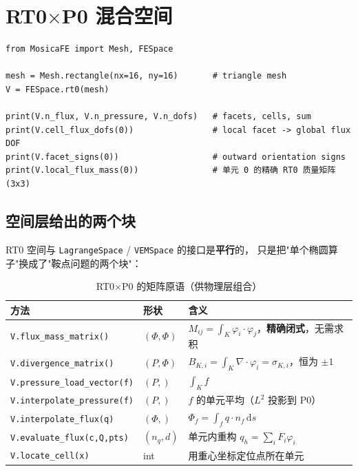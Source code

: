 \documentclass[UTF8,11pt,oneside]{ctexbook}
\theoremstyle{definition}
\theoremstyle{plain}
\newcommand{\code}[1]{\texttt{#1}}
\newcommand{\dif}{\,\mathrm{d}}
\begin{document}
\section{RT0$\times$P0 混合空间}

\begin{lstlisting}[language=MosicaFE,caption={示例 5.3：混合空间}]
from MosicaFE import Mesh, FESpace

mesh = Mesh.rectangle(nx=16, ny=16)       # triangle mesh
V = FESpace.rt0(mesh)

print(V.n_flux, V.n_pressure, V.n_dofs)   # facets, cells, sum
print(V.cell_flux_dofs(0))                # local facet -> global flux DOF
print(V.facet_signs(0))                   # outward orientation signs
print(V.local_flux_mass(0))               # 单元 0 的精确 RT0 质量矩阵 (3x3)
\end{lstlisting}

\subsection{空间层给出的两个块}

RT0 空间与 \code{LagrangeSpace} / \code{VEMSpace} 的接口是\textbf{平行}的，
只是把"单个椭圆算子"换成了"鞍点问题的两个块"：

\begin{table}[htbp]
\centering
\caption{RT0$\times$P0 的矩阵原语（供物理层组合）}
\label{tab:rt0-blocks}
\begin{lrbox}{\guideTableBox}
\begin{tabular}{@{}L{5.4cm}L{2.9cm}L{6.1cm}@{}}
\toprule
方法 & 形状 & 含义 \\
\midrule
\code{V.flux\_\allowbreak mass\_\allowbreak matrix()} & $(\Phi,\Phi)$ & $M_{ij}=\int_K\varphi_i\cdot\varphi_j$，\textbf{精确闭式}，无需求积 \\
\code{V.divergence\_\allowbreak matrix()} & $(P,\Phi)$ & $B_{K,i}=\int_K\nabla\cdot\varphi_i=\sigma_{K,i}$，恒为 $\pm1$ \\
\code{V.pressure\_\allowbreak load\_\allowbreak vector(f)} & $(P,)$ & $\int_K f$ \\
\midrule
\code{V.interpolate\_\allowbreak pressure(f)} & $(P,)$ & $f$ 的单元平均（$L^2$ 投影到 P0） \\
\code{V.interpolate\_\allowbreak flux(q)} & $(\Phi,)$ & $\Phi_f=\int_f q\cdot n_f\dif s$ \\
\code{V.evaluate\_\allowbreak flux(c,\allowbreak Q,\allowbreak pts)} & $(n_q,d)$ & 单元内重构 $q_h=\sum_i F_i\varphi_i$ \\
\code{V.locate\_\allowbreak cell(x)} & int & 用重心坐标定位点所在单元 \\
\bottomrule
\end{tabular}
\end{lrbox}%
\ifdim\wd\guideTableBox>\linewidth
  \resizebox{\linewidth}{!}{\usebox{\guideTableBox}}%
\else\usebox{\guideTableBox}\fi
\end{table}
\end{document}

